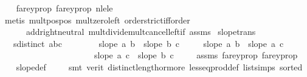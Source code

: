 \begin{isabellebody}
%
\isadelimproof
\ \ %
\endisadelimproof
%
\isatagproof
{}\isamarkupfalse%
\ farey{\isacharunderscore}{\kern0pt}prop{}\ farey{\isacharunderscore}{\kern0pt}prop{}\ nle{\isacharunderscore}{\kern0pt}le\isanewline
\ \ \isamarkupfalse%
\ {\isacharparenleft}{\kern0pt}metis\ mult{\isacharunderscore}{\kern0pt}pos{\isacharunderscore}{\kern0pt}pos\ mult{\isacharunderscore}{\kern0pt}zero{\isacharunderscore}{\kern0pt}left\ order{\isachardot}{\kern0pt}strict{\isacharunderscore}{\kern0pt}iff{\isacharunderscore}{\kern0pt}order\isanewline
\ \ \ \ \ \ add{\isachardot}{\kern0pt}right{\isacharunderscore}{\kern0pt}neutral\ mult{\isacharunderscore}{\kern0pt}divide{\isacharunderscore}{\kern0pt}mult{\isacharunderscore}{\kern0pt}cancel{\isacharunderscore}{\kern0pt}left{\isacharunderscore}{\kern0pt}if\ assms{\isacharparenright}{\kern0pt}{\isacharplus}{\kern0pt}%
\endisatagproof
{\isafoldproof}%
%
\isadelimproof
\isanewline
%
\endisadelimproof
\isanewline
\isanewline
{}\isamarkupfalse%
\ slope{\isacharunderscore}{\kern0pt}trans{\isacharcolon}{\kern0pt}\isanewline
\ \ \ {\isachardoublequoteopen}sdistinct\ {\isacharbrackleft}{\kern0pt}a{\isacharcomma}{\kern0pt}b{\isacharcomma}{\kern0pt}c{\isacharbrackright}{\kern0pt}{\isachardoublequoteclose}\ \isanewline
\ \ \ \ \ \ \ {\isachardoublequoteopen}slope\ a\ b\ {\isacharless}{\kern0pt}\ slope\ b\ c{\isachardoublequoteclose}\isanewline
\ \ \ \ \ {\isachardoublequoteopen}slope\ a\ b\ {\isacharless}{\kern0pt}\ slope\ a\ c{\isachardoublequoteclose}\ \isanewline
\ \ \ \ \ \ \ \ \ \ \ \ \ \ \ \ \ \ \ \ \ \ {\isachardoublequoteopen}slope\ a\ c\ {\isacharless}{\kern0pt}\ slope\ b\ c{\isachardoublequoteclose}\ \isanewline
%
\isadelimproof
\ \ %
\endisadelimproof
%
\isatagproof
{}\isamarkupfalse%
\ assms\ farey{\isacharunderscore}{\kern0pt}prop{}\ farey{\isacharunderscore}{\kern0pt}prop{}\isanewline
\ \ \isamarkupfalse%
\ slope{\isacharunderscore}{\kern0pt}def\ \isanewline
\ \ \isamarkupfalse%
\ {\isacharparenleft}{\kern0pt}smt\ {\isacharparenleft}{\kern0pt}verit{\isacharparenright}{\kern0pt}\ distinct{\isacharunderscore}{\kern0pt}length{\isacharunderscore}{\kern0pt}{}{\isacharunderscore}{\kern0pt}or{\isacharunderscore}{\kern0pt}more\ less{\isacharunderscore}{\kern0pt}eq{\isacharunderscore}{\kern0pt}prod{\isacharunderscore}{\kern0pt}def\ list{\isachardot}{\kern0pt}simps{\isacharparenleft}{\kern0pt}{}{\isacharparenright}{\kern0pt}\ sorted{}{\isacharparenright}{\kern0pt}{\isacharplus}{\kern0pt}%

\end{isabellebody}
